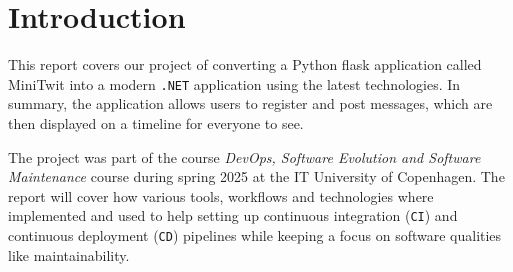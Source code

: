 \section{Introduction}
\label{ch:introduction}

This report covers our project of converting a Python flask application called MiniTwit
into a modern \texttt{.NET} application using the latest technologies. In summary, the application allows users to register and post messages,  which are then displayed on a timeline for everyone to see.

The project was part of the course \textit{DevOps, Software Evolution and Software Maintenance} course during spring 2025 at the IT University of Copenhagen. The report will cover how various tools, workflows and technologies where implemented and used to help setting up continuous integration (\texttt{CI}) and continuous deployment (\texttt{CD}) pipelines while keeping a focus on
software qualities like maintainability.
